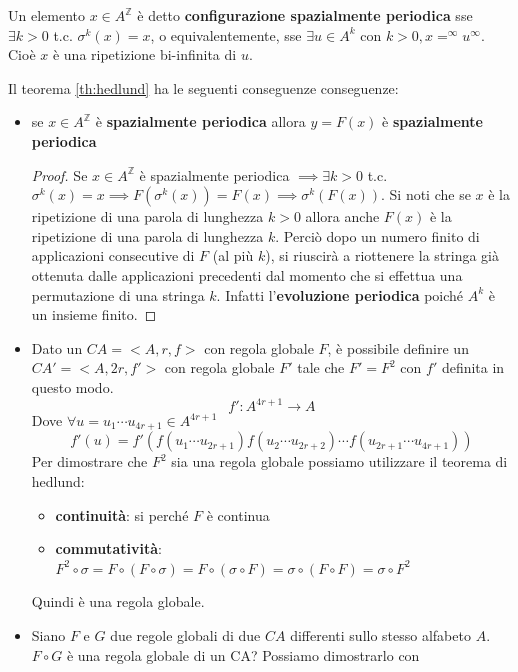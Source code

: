\begin{definizione}
    Un elemento $x\in A^\mathbb{Z}$ è detto \textbf{configurazione spazialmente 
    periodica} sse $\exists k>0 $ t.c. $\sigma^k(x) = x$, o equivalentemente, sse 
    $\exists u\in A^k$ con $k>0, x = ^\infty u ^\infty$. Cioè $x$ è una ripetizione
    bi-infinita di $u$.
\end{definizione}

Il teorema \ref{th:hedlund} ha le seguenti conseguenze conseguenze:
\begin{itemize}
    \item se $x\in A^\mathbb{Z}$ è \textbf{spazialmente periodica} allora $y=F(x)$
    è  \textbf{spazialmente periodica}
    \begin{proof}
        Se $x\in A^\mathbb{Z}$  è spazialmente periodica $\implies\exists k>0$ t.c.
        $\sigma^k(x)=x \implies F(\sigma^k(x)) = F(x)\implies \sigma^k(F(x))$.
        Si noti che se $x$ è la ripetizione di una parola di lunghezza $k>0$ allora
        anche $F(x)$ è la ripetizione di una parola di lunghezza $k$. Perciò dopo
        un numero finito di applicazioni consecutive di $F$ (al più $k$), si riuscirà
        a riottenere la stringa già ottenuta dalle applicazioni precedenti dal momento
        che si effettua una permutazione di una stringa $k$. Infatti l'\textbf{evoluzione 
        periodica} poiché $A^k$ è un insieme finito.
    \end{proof}
    \item Dato un $CA = <A,r,f>$ con regola globale $F$, è possibile definire un  $CA '= <A,2r,f'>$ 
    con regola globale $F'$ tale che $F'=F^2$ con $f'$ definita in questo modo.
    $$f':A^{4r+1}\rightarrow A$$
    Dove $\forall u=u_1\cdots u_{4r+1}\in A^{4r+1}$
    $$f'(u) = f'(f(u_1\cdots u_{2r+1})f(u_{2}\cdots u_{2r+2})\cdots f(u_{2r+1}\cdots u_{4r+1}))$$
    Per dimostrare che $F^2$ sia una regola globale possiamo utilizzare il teorema di 
    hedlund:
    \begin{itemize}
        \item \textbf{continuità}: si perché $F$ è continua
        \item \textbf{commutatività}: $F^2\circ \sigma = F\circ (F\circ \sigma ) = F\circ (\sigma\circ F  ) = \sigma\circ (F\circ F  )  = \sigma \circ F^2$
    \end{itemize}
    Quindi è una regola globale.
    \item Siano $F$ e $G$ due regole globali di due $CA$ differenti sullo stesso 
    alfabeto $A$. $F\circ G$ è una regola globale di un CA? Possiamo dimostrarlo con

\end{itemize}

